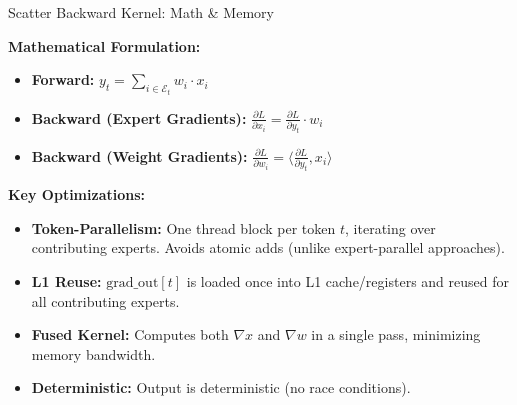 \documentclass{beamer}
\begin{document}
\begin{frame}{Scatter Backward Kernel: Math \& Memory}

\textbf{Mathematical Formulation:}
\begin{itemize}
    \item \textbf{Forward:} $y_t = \sum_{i \in \mathcal{E}_t} w_i \cdot x_i$
    \item \textbf{Backward (Expert Gradients):} $\frac{\partial L}{\partial x_i} = \frac{\partial L}{\partial y_t} \cdot w_i$
    \item \textbf{Backward (Weight Gradients):} $\frac{\partial L}{\partial w_i} = \langle \frac{\partial L}{\partial y_t}, x_i \rangle$
\end{itemize}

\vspace{0.3cm}

\textbf{Key Optimizations:}
\begin{itemize}
    \item \textbf{Token-Parallelism:} One thread block per token $t$, iterating over contributing experts. Avoids atomic adds (unlike expert-parallel approaches).
    \item \textbf{L1 Reuse:} $\text{grad\_out}[t]$ is loaded once into L1 cache/registers and reused for all contributing experts.
    \item \textbf{Fused Kernel:} Computes both $\nabla x$ and $\nabla w$ in a single pass, minimizing memory bandwidth.
    \item \textbf{Deterministic:} Output is deterministic (no race conditions).
\end{itemize}

\end{frame}
\end{document}
